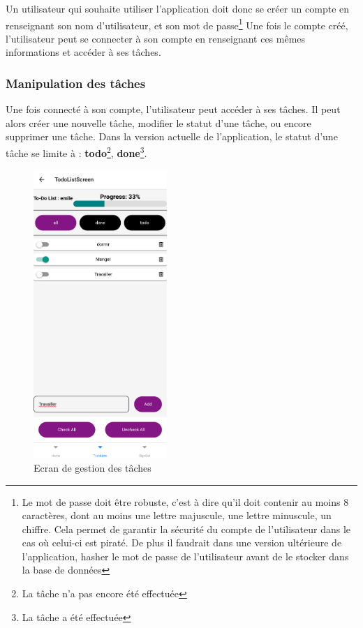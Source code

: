 \documentclass[12pt]{article}
\begin{document}
        Un utilisateur qui souhaite utiliser l'application doit donc se créer un compte en renseignant son nom d'utilisateur,
        et son mot de passe\footnote{Le mot de passe doit être robuste, c'est à dire qu'il doit contenir au moins 8 caractères, dont au moins
        une lettre majuscule, une lettre minuscule, un chiffre. Cela permet de garantir la sécurité du compte de l'utilisateur
        dans le cas où celui-ci est piraté. De plus il faudrait dans une version ultérieure de l'application, hasher le mot de passe de l'utilisateur avant
        de le stocker dans la base de données}
        Une fois le compte créé, l'utilisateur peut se connecter à son compte en renseignant ces mêmes
        informations et accéder à ses tâches.\\

        \subsubsection{Manipulation des tâches}\label{subsubsec:manipulation-des-taches}
        Une fois connecté à son compte, l'utilisateur peut accéder à ses tâches. Il peut alors créer une nouvelle tâche,
        modifier le statut d'une tâche, ou encore supprimer une tâche. Dans la version actuelle de l'application, le statut
        d'une tâche se limite à : \textbf{todo}\footnote{La tâche n'a pas encore été effectuée}, \textbf{done}\footnote{La tâche a été effectuée}.

        \begin{figure}[H]
            \centering
            \includegraphics[width=0.45\textwidth]{images/tasks}
            \caption{Ecran de gestion des tâches}
            \label{fig:gestion-taches}
        \end{figure}
\end{document}
